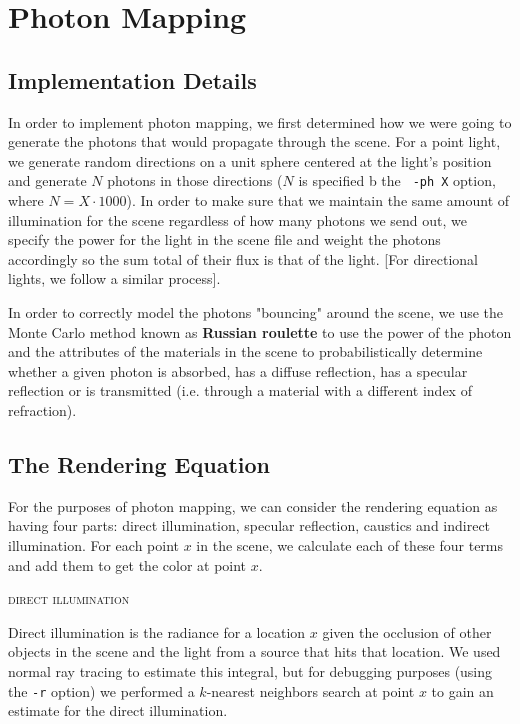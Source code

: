 \documentclass{article}
\begin{document}
\section{Photon Mapping} %
\label{sec:photonmapping}

\subsection{Implementation Details} %
\label{sub:implementationdetails}
In order to implement photon mapping, we first determined how we were going to generate the photons that would propagate through the scene. For a point light, we generate random directions on a unit sphere centered at the light's position and generate $N$ photons in those directions ($N$ is specified b the \verb+ -ph X+ option, where $N = X \cdot 1000$). In order to make sure that we maintain the same amount of illumination for the scene regardless of how many photons we send out, we specify the power for the light in the scene file and weight the photons accordingly so the sum total of their flux is that of the light. [For directional lights, we follow a similar process].

In order to correctly model the photons "bouncing" around the scene, we use the Monte Carlo method known as {\bf Russian roulette} to use the power of the photon and the attributes of the materials in the scene to probabilistically determine whether a given photon is absorbed, has a diffuse reflection, has a specular reflection or is transmitted (i.e. through a material with a different index of refraction).

\subsection{The Rendering Equation} %
\label{sub:therenderingequation}
For the purposes of photon mapping, we can consider the rendering equation as having four parts: direct illumination, specular reflection, caustics and indirect illumination. For each point $x$ in the scene, we calculate each of these four terms and add them to get the color at point $x$.

\begin{center}\textsc{direct illumination}\end{center} 

Direct illumination is the radiance for a location $x$ given the occlusion of other objects in the scene and the light from a source that hits that location. We used normal ray tracing to estimate this integral, but for debugging purposes (using the \verb+-r+ option) we performed a $k$-nearest neighbors search at point $x$ to gain an estimate for the direct illumination.
\end{document}
